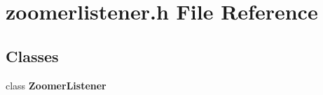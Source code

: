 \section{zoomerlistener.\+h File Reference}
\label{zoomerlistener_8h}
\subsection*{Classes}
\begin{DoxyCompactItemize}
\item 
class {\bf Zoomer\+Listener}
\end{DoxyCompactItemize}
